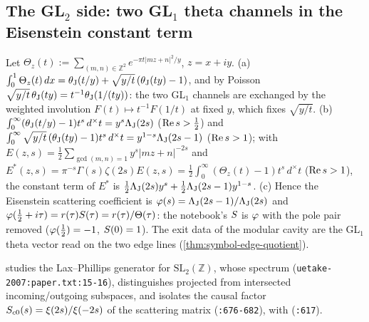 \subsection{The GL$_2$ side: two GL$_1$ theta channels in the Eisenstein constant term}

\begin{proposition}
\label{prop:siegel-constant-term}
Let $\Theta_z(t) := \sum_{(m,n)\in\mathbb Z^2}e^{-\pi t|mz+n|^2/y}$, $z = x+iy$. (a) $\int_0^1\Theta_z(t)\,dx = \theta_{\mathrm J}(t/y)
+ \sqrt{y/t}\,(\theta_{\mathrm J}(ty)-1)$, and by Poisson $\sqrt{y/t}\,\theta_{\mathrm J}(ty) = t^{-1}\theta_{\mathrm J}(1/(ty))$: the two GL$_1$
channels are exchanged by the weighted involution $F(t)\mapsto t^{-1}F(1/t)$ at fixed $y$, which fixes $\sqrt{y/t}$.
(b) $\int_0^\infty(\theta_{\mathrm J}(t/y)-1)t^s\,d^\times t = y^s\Lambda_{\mathrm J}(2s)$ ($\operatorname{Re} s>\tfrac12$) and $\int_0^\infty\sqrt{y/t}\,
(\theta_{\mathrm J}(ty)-1)t^s\,d^\times t = y^{1-s}\Lambda_{\mathrm J}(2s-1)$ ($\operatorname{Re} s>1$); with $E(z,s) = \tfrac12\sum_{\gcd(m,n)=1}y^s|mz+n|^{-2s}$
and $E^*(z,s) = \pi^{-s}\Gamma(s)\zeta(2s)E(z,s) = \tfrac12\int_0^\infty(\Theta_z(t)-1)t^s\,d^\times t$ ($\operatorname{Re} s>1$), the constant
term of $E^*$ is $\tfrac12\Lambda_{\mathrm J}(2s)y^s + \tfrac12\Lambda_{\mathrm J}(2s-1)y^{1-s}$. (c) Hence the Eisenstein scattering coefficient is
$\varphi(s) = \Lambda_{\mathrm J}(2s-1)/\Lambda_{\mathrm J}(2s)$ and $\varphi(\tfrac12+i\tau) = r(\tau)S(\tau) = r(\tau)/\Theta(\tau)$:
the notebook's $S$ is $\varphi$ with the pole pair removed ($\varphi(\tfrac12) = -1$, $S(0) = 1$). The exit data
of the modular cavity are the GL$_1$ theta vector read on the two edge lines (\cref{thm:symbol-edge-quotient}).
\end{proposition}

\begin{citedfact}
\label{cit:uetake-causal-factor}
\cite{uetake2007lax} studies the Lax--Phillips generator for $\mathrm{SL}_2(\mathbb Z)$, whose spectrum
\texttt{}
(\texttt{uetake-2007:paper.txt:15-16}), distinguishes projected from intersected incoming/outgoing subspaces, and
isolates the causal factor $S_{c0}(s) = \xi(2s)/\xi(-2s)$ of the scattering matrix (\texttt{:676-682}), with
\texttt{} (\texttt{:617}).
\end{citedfact}

